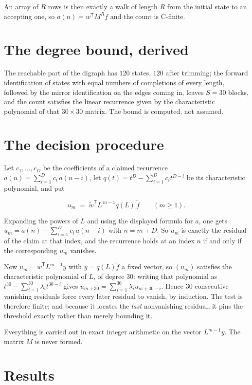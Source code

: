 \documentclass[11pt]{article}
\theoremstyle{definition}
\begin{document}
An array of $R$ rows is then exactly a walk of length $R$ from the initial state to an accepting one, so $a(n) = w^{\mathsf T}M^{R}f$ and the count is C-finite.

\section{The degree bound, derived}

The reachable part of the digraph has $120$ states, $120$ after trimming; the forward identification of states with equal numbers of completions of every length, followed by the mirror identification on the edges coming in, leaves $S = 30$ blocks, and the count satisfies the linear recurrence given by the characteristic polynomial of that $30\times30$ matrix. The bound is computed, not assumed.

\section{The decision procedure}

Let $c_1,\dots,c_D$ be the coefficients of a claimed recurrence $a(n) = \sum_{i=1}^{D} c_i\,a(n-i)$, let $q(t) = t^{D} - \sum_{i=1}^{D} c_i t^{D-i}$ be its characteristic polynomial, and put

\[u_m \;=\; \tilde w^{\mathsf T} L^{\,m-1} q(L)\,\tilde f \qquad (m \ge 1).\]

Expanding the powers of $L$ and using the displayed formula for $a$, one gets $u_m = a(n) - \sum_{i=1}^{D} c_i\,a(n-i)$ with $n = m + D$. So $u_m$ is exactly the residual of the claim at that index, and the recurrence holds at an index $n$ if and only if the corresponding $u_m$ vanishes.

Now $u_m = \tilde w^{\mathsf T} L^{m-1} y$ with $y = q(L)\tilde f$ a fixed vector, so $(u_m)$ satisfies the characteristic polynomial of $L$, of degree $30$: writing that polynomial as $t^{30} - \sum_{i=1}^{30} \lambda_i t^{30-i}$ gives $u_{m+30} = \sum_{i=1}^{30} \lambda_i u_{m+30-i}$. Hence $30$ consecutive vanishing residuals force every later residual to vanish, by induction. The test is therefore finite; and because it locates the {\itshape last} nonvanishing residual, it pins the threshold exactly rather than merely bounding it.

Everything is carried out in exact integer arithmetic on the vector $L^{m-1}y$. The matrix $M$ is never formed.

\section{Results}
\end{document}
